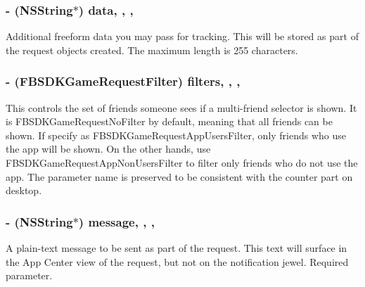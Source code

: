 \subsubsection[{data}]{\setlength{\rightskip}{0pt plus 5cm}-\/ (N\+S\+String$\ast$) data\hspace{0.3cm}{\ttfamily [read]}, {\ttfamily [write]}, {\ttfamily [nonatomic]}, {\ttfamily [copy]}}\label{interface_f_b_s_d_k_game_request_content_a5842159d850c0e701d7753d64e1e22be}
Additional freeform data you may pass for tracking. This will be stored as part of the request objects created. The maximum length is 255 characters. \hypertarget{interface_f_b_s_d_k_game_request_content_ae1268dd62ab78042145dd25bc4ef8961}{}
\subsubsection[{filters}]{\setlength{\rightskip}{0pt plus 5cm}-\/ (F\+B\+S\+D\+K\+Game\+Request\+Filter) filters\hspace{0.3cm}{\ttfamily [read]}, {\ttfamily [write]}, {\ttfamily [nonatomic]}, {\ttfamily [assign]}}\label{interface_f_b_s_d_k_game_request_content_ae1268dd62ab78042145dd25bc4ef8961}
This controls the set of friends someone sees if a multi-\/friend selector is shown. It is F\+B\+S\+D\+K\+Game\+Request\+No\+Filter by default, meaning that all friends can be shown. If specify as F\+B\+S\+D\+K\+Game\+Request\+App\+Users\+Filter, only friends who use the app will be shown. On the other hands, use F\+B\+S\+D\+K\+Game\+Request\+App\+Non\+Users\+Filter to filter only friends who do not use the app.  The parameter name is preserved to be consistent with the counter part on desktop. \hypertarget{interface_f_b_s_d_k_game_request_content_a88accc7b486e626dae7d08e744a9af66}{}
\subsubsection[{message}]{\setlength{\rightskip}{0pt plus 5cm}-\/ (N\+S\+String$\ast$) message\hspace{0.3cm}{\ttfamily [read]}, {\ttfamily [write]}, {\ttfamily [nonatomic]}, {\ttfamily [copy]}}\label{interface_f_b_s_d_k_game_request_content_a88accc7b486e626dae7d08e744a9af66}
A plain-\/text message to be sent as part of the request. This text will surface in the App Center view of the request, but not on the notification jewel. Required parameter. \hypertarget{interface_f_b_s_d_k_game_request_content_a3ea25b3469e4471f3cde2d36fba75127}{}
